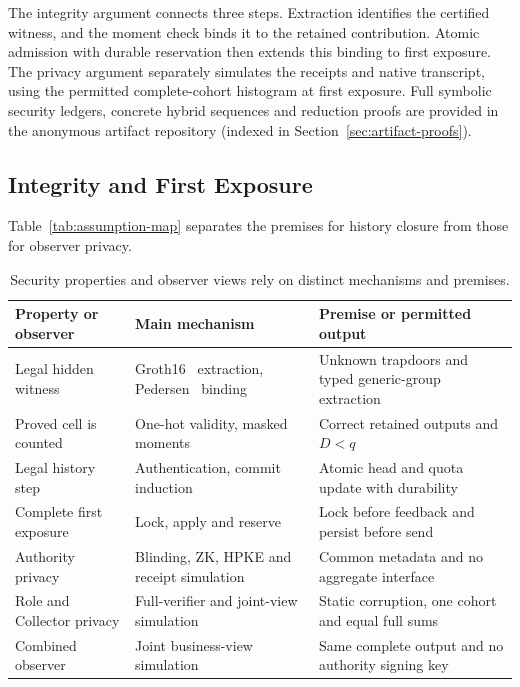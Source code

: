 \documentclass[conference,compsoc]{IEEEtran}
\theoremstyle{definition}
\numberwithin{equation}{section}
\numberwithin{table}{section}
\numberwithin{figure}{section}
\theoremstyle{plain}
\begin{document}
The integrity argument connects three steps. Extraction identifies the
certified witness, and the moment check binds it to the retained contribution.
Atomic admission with durable reservation then extends this binding to first exposure. The
privacy argument separately simulates the receipts and native transcript,
using the permitted complete-cohort histogram at first exposure.
Full symbolic security ledgers, concrete hybrid sequences and reduction proofs are provided in the anonymous artifact repository (indexed in Section~\ref{sec:artifact-proofs}).

\subsection{Integrity and First Exposure}

Table~\ref{tab:assumption-map} separates the premises for history closure
from those for observer privacy.

\begin{table}[t]
\centering
\caption{Security properties and observer views rely on distinct mechanisms and premises.}
\label{tab:assumption-map}
\label{tab:privacy-domain}
\footnotesize
\renewcommand{\arraystretch}{1.08}
\begin{tabularx}{\columnwidth}{@{}YYY@{}}
\toprule
\textbf{Property or observer} & \textbf{Main mechanism} & \textbf{Premise or permitted output} \\
\midrule
Legal hidden witness & Groth16~\cite{Groth2016pairing} extraction, Pedersen~\cite{Pedersen1991Commitment} binding & Unknown trapdoors and typed generic-group extraction \\
Proved cell is counted & One-hot validity, masked moments & Correct retained outputs and \(D<q\) \\
Legal history step & Authentication, commit induction & Atomic head and quota update with durability \\
Complete first exposure & Lock, apply and reserve & Lock before feedback and persist before send \\
Authority privacy & Blinding, ZK, HPKE and receipt simulation & Common metadata and no aggregate interface \\
Role and Collector privacy & Full-verifier and joint-view simulation & Static corruption, one cohort and equal full sums \\
Combined observer & Joint business-view simulation & Same complete output and no authority signing key \\
\bottomrule
\end{tabularx}
\end{table}
\end{document}
